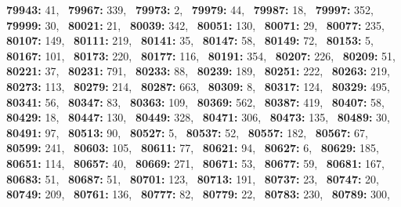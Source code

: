 \textbf{79943:} 41,\allowbreak~ 
\textbf{79967:} 339,\allowbreak~ 
\textbf{79973:} 2,\allowbreak~ 
\textbf{79979:} 44,\allowbreak~ 
\textbf{79987:} 18,\allowbreak~ 
\textbf{79997:} 352,\allowbreak~ 
\textbf{79999:} 30,\allowbreak~ 
\textbf{80021:} 21,\allowbreak~ 
\textbf{80039:} 342,\allowbreak~ 
\textbf{80051:} 130,\allowbreak~ 
\textbf{80071:} 29,\allowbreak~ 
\textbf{80077:} 235,\allowbreak~ 
\textbf{80107:} 149,\allowbreak~ 
\textbf{80111:} 219,\allowbreak~ 
\textbf{80141:} 35,\allowbreak~ 
\textbf{80147:} 58,\allowbreak~ 
\textbf{80149:} 72,\allowbreak~ 
\textbf{80153:} 5,\allowbreak~ 
\textbf{80167:} 101,\allowbreak~ 
\textbf{80173:} 220,\allowbreak~ 
\textbf{80177:} 116,\allowbreak~ 
\textbf{80191:} 354,\allowbreak~ 
\textbf{80207:} 226,\allowbreak~ 
\textbf{80209:} 51,\allowbreak~ 
\textbf{80221:} 37,\allowbreak~ 
\textbf{80231:} 791,\allowbreak~ 
\textbf{80233:} 88,\allowbreak~ 
\textbf{80239:} 189,\allowbreak~ 
\textbf{80251:} 222,\allowbreak~ 
\textbf{80263:} 219,\allowbreak~ 
\textbf{80273:} 113,\allowbreak~ 
\textbf{80279:} 214,\allowbreak~ 
\textbf{80287:} 663,\allowbreak~ 
\textbf{80309:} 8,\allowbreak~ 
\textbf{80317:} 124,\allowbreak~ 
\textbf{80329:} 495,\allowbreak~ 
\textbf{80341:} 56,\allowbreak~ 
\textbf{80347:} 83,\allowbreak~ 
\textbf{80363:} 109,\allowbreak~ 
\textbf{80369:} 562,\allowbreak~ 
\textbf{80387:} 419,\allowbreak~ 
\textbf{80407:} 58,\allowbreak~ 
\textbf{80429:} 18,\allowbreak~ 
\textbf{80447:} 130,\allowbreak~ 
\textbf{80449:} 328,\allowbreak~ 
\textbf{80471:} 306,\allowbreak~ 
\textbf{80473:} 135,\allowbreak~ 
\textbf{80489:} 30,\allowbreak~ 
\textbf{80491:} 97,\allowbreak~ 
\textbf{80513:} 90,\allowbreak~ 
\textbf{80527:} 5,\allowbreak~ 
\textbf{80537:} 52,\allowbreak~ 
\textbf{80557:} 182,\allowbreak~ 
\textbf{80567:} 67,\allowbreak~ 
\textbf{80599:} 241,\allowbreak~ 
\textbf{80603:} 105,\allowbreak~ 
\textbf{80611:} 77,\allowbreak~ 
\textbf{80621:} 94,\allowbreak~ 
\textbf{80627:} 6,\allowbreak~ 
\textbf{80629:} 185,\allowbreak~ 
\textbf{80651:} 114,\allowbreak~ 
\textbf{80657:} 40,\allowbreak~ 
\textbf{80669:} 271,\allowbreak~ 
\textbf{80671:} 53,\allowbreak~ 
\textbf{80677:} 59,\allowbreak~ 
\textbf{80681:} 167,\allowbreak~ 
\textbf{80683:} 51,\allowbreak~ 
\textbf{80687:} 51,\allowbreak~ 
\textbf{80701:} 123,\allowbreak~ 
\textbf{80713:} 191,\allowbreak~ 
\textbf{80737:} 23,\allowbreak~ 
\textbf{80747:} 20,\allowbreak~ 
\textbf{80749:} 209,\allowbreak~ 
\textbf{80761:} 136,\allowbreak~ 
\textbf{80777:} 82,\allowbreak~ 
\textbf{80779:} 22,\allowbreak~ 
\textbf{80783:} 230,\allowbreak~ 
\textbf{80789:} 300,\allowbreak~ 
